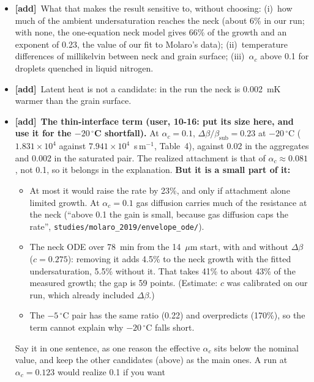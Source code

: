 \documentclass[11pt]{article}
\newcommand{\tA}{\textcolor{have}{\textbf{[add]}}\ }
\begin{document}
\begin{enumerate}
\begin{itemize}
    $9\times10^{-5}$ in relative vapor density, the equivalent of 4.9 to
    1.0~mK; the chamber's undersaturation is $2.85\times10^{-3}$, 6 to 31
    times larger.
  \item \tA What that makes the result sensitive to, without choosing:
    (i)~how much of the ambient undersaturation reaches the neck (about 6\%
    in our run; with none, the one-equation neck model gives 66\% of the
    growth and an exponent of 0.23, the value of our fit to Molaro's data); (ii)~temperature
    differences of millikelvin between neck and grain surface;
    (iii)~$\alpha_c$ above 0.1 for droplets quenched in liquid nitrogen.
  \item \tA Latent heat is not a candidate: in the run the neck is 0.002~mK
    warmer than the grain surface.
  \item \tA \textbf{The thin-interface term (user, 10-16: put its size
    here, and use it for the $-20\,^\circ$C shortfall).} At $\alpha_c =
    0.1$, $\Delta\beta/\beta_{\mathrm{sub}} = 0.23$ at $-20\,^\circ$C
    ($1.831\times10^{4}$ against $7.941\times10^{4}$~s\,m$^{-1}$, Table~4),
    against 0.02 in the aggregates and 0.002 in the saturated pair. The
    realized attachment is that of $\alpha_c \approx 0.081$, not 0.1, so it
    belongs in the explanation. \textbf{But it is a small part of it:}
    \begin{itemize}
    \item At most it would raise the rate by 23\%, and only if attachment
      alone limited growth. At $\alpha_c = 0.1$ gas diffusion carries much
      of the resistance at the neck (``above 0.1 the gain is small, because
      gas diffusion caps the rate'', \texttt{studies/molaro\_2019/envelope\_ode/}).
    \item The neck ODE over 78~min from the 14~$\mu$m start, with and
      without $\Delta\beta$ ($c = 0.275$): removing it adds 4.5\% to the
      neck growth with the fitted undersaturation, 5.5\% without it. That
      takes 41\% to about 43\% of the measured growth; the gap is 59
      points. (Estimate: $c$ was calibrated on our run, which already
      included $\Delta\beta$.)
    \item The $-5\,^\circ$C pair has the same ratio (0.22) and overpredicts
      (170\%), so the term cannot explain why $-20\,^\circ$C falls short.
    \end{itemize}
    Say it in one sentence, as one reason the effective $\alpha_c$ sits
    below the nominal value, and keep the other candidates (above) as the
    main ones. A run at $\alpha_c = 0.123$ would realize 0.1 if you want

\end{itemize}
\end{enumerate}
\end{document}

